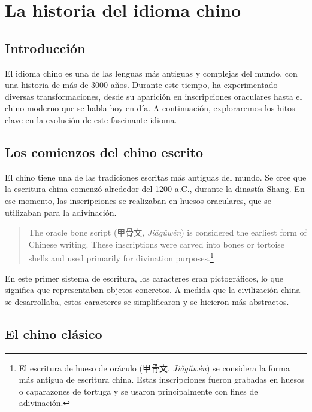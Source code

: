 \chapter{La historia del idioma chino}

\section{Introducción}

El idioma chino es una de las lenguas más antiguas y complejas del mundo, con una historia de más de 3000 años. Durante este tiempo, ha experimentado diversas transformaciones, desde su aparición en inscripciones oraculares hasta el chino moderno que se habla hoy en día. A continuación, exploraremos los hitos clave en la evolución de este fascinante idioma.

\section{Los comienzos del chino escrito}

El chino tiene una de las tradiciones escritas más antiguas del mundo. Se cree que la escritura china comenzó alrededor del 1200 a.C., durante la dinastía Shang. En ese momento, las inscripciones se realizaban en huesos oraculares, que se utilizaban para la adivinación.

\begin{quote}\foreignlanguage{english}{
The oracle bone script (\foreignlanguage{chinese}{甲骨文}, \emph{Jiǎgǔwén}) is considered the earliest form of Chinese writing. These inscriptions were carved into bones or tortoise shells and used primarily for divination purposes.\footnote{El escritura de hueso de oráculo (\foreignlanguage{chinese}{甲骨文}, \emph{Jiǎgǔwén}) se considera la forma más antigua de escritura china. Estas inscripciones fueron grabadas en huesos o caparazones de tortuga y se usaron principalmente con fines de adivinación.} }
\end{quote}

En este primer sistema de escritura, los caracteres eran pictográficos, lo que significa que representaban objetos concretos. A medida que la civilización china se desarrollaba, estos caracteres se simplificaron y se hicieron más abstractos.

\section{El chino clásico}

